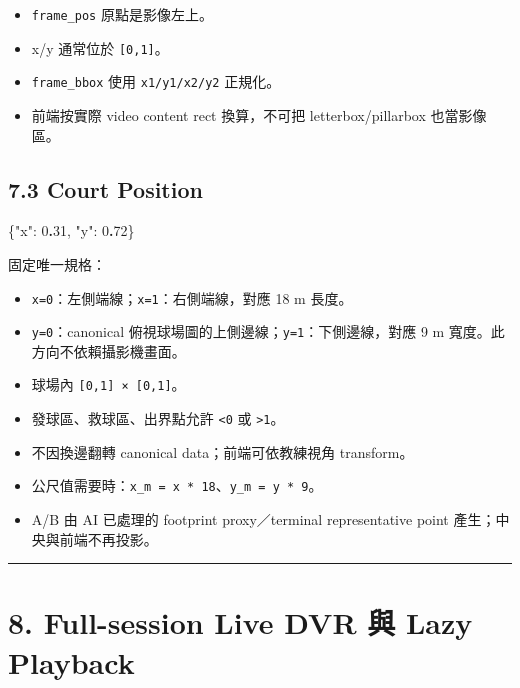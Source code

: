 \documentclass[
  9pt,
  a4paper,
]{article}
\newenvironment{Shaded}{}{}
\newcommand{\DataTypeTok}[1]{\textcolor[rgb]{0.56,0.13,0.00}{#1}}
\newcommand{\DecValTok}[1]{\textcolor[rgb]{0.25,0.63,0.44}{#1}}
\newcommand{\ErrorTok}[1]{\textcolor[rgb]{1.00,0.00,0.00}{\textbf{#1}}}
\newcommand{\FunctionTok}[1]{\textcolor[rgb]{0.02,0.16,0.49}{#1}}
\providecommand{\tightlist}{%
  \setlength{\itemsep}{0pt}\setlength{\parskip}{0pt}}
\begin{document}
\begin{itemize}
\tightlist
\item
  \texttt{frame\_\allowbreak{}pos} 原點是影像左上。
\item
  x/y 通常位於 \texttt{{[}0,1{]}}。
\item
  \texttt{frame\_\allowbreak{}bbox} 使用 \texttt{x1/y1/x2/y2} 正規化。
\item
  前端按實際 video content rect 換算，不可把 letterbox/pillarbox
  也當影像區。
\end{itemize}

\subsection{7.3 Court Position}\label{73-court-position}

\begin{Shaded}
\begin{Highlighting}[]
\FunctionTok{\{}\DataTypeTok{"x"}\FunctionTok{:} \DecValTok{0}\ErrorTok{.}\DecValTok{31}\FunctionTok{,} \DataTypeTok{"y"}\FunctionTok{:} \DecValTok{0}\ErrorTok{.}\DecValTok{72}\FunctionTok{\}}
\end{Highlighting}
\end{Shaded}

固定唯一規格：

\begin{itemize}
\tightlist
\item
  \texttt{x=0}：左側端線；\texttt{x=1}：右側端線，對應 18 m 長度。
\item
  \texttt{y=0}：canonical
  俯視球場圖的上側邊線；\texttt{y=1}：下側邊線，對應 9 m
  寬度。此方向不依賴攝影機畫面。
\item
  球場內 \texttt{{[}0,1{]}\ ×\ {[}0,1{]}}。
\item
  發球區、救球區、出界點允許 \texttt{\textless{}0} 或
  \texttt{\textgreater{}1}。
\item
  不因換邊翻轉 canonical data；前端可依教練視角 transform。
\item
  公尺值需要時：\texttt{x\_\allowbreak{}m\ =\ x\ *\ 18}、\texttt{y\_\allowbreak{}m\ =\ y\ *\ 9}。
\item
  A/B 由 AI 已處理的 footprint proxy／terminal representative point
  產生；中央與前端不再投影。
\end{itemize}

\begin{center}\rule{0.5\linewidth}{0.5pt}\end{center}

\section{8. Full-session Live DVR 與 Lazy
Playback}\label{8-full-session-live-dvr-ux8207-lazy-playback}
\end{document}
